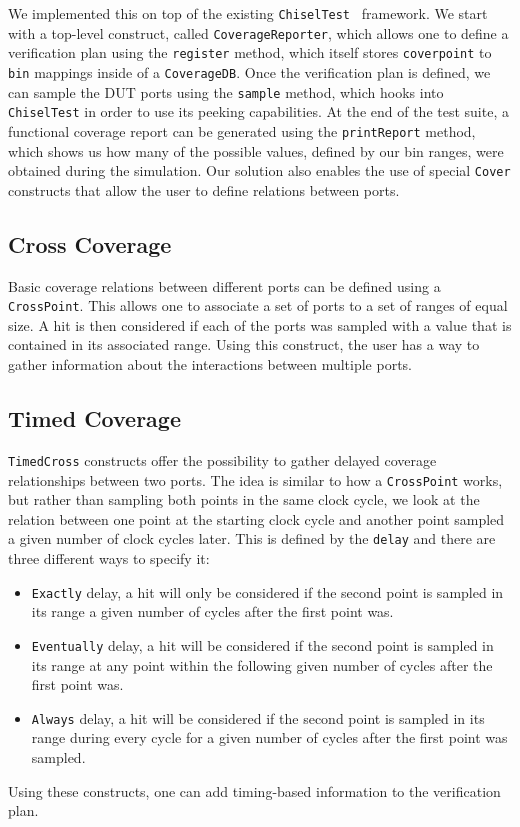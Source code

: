 \documentclass[conference]{IEEEtran}
\begin{document}
We implemented this on top of the existing \texttt{ChiselTest}~\cite{chisel:tester2} framework. We start with a top-level construct, called \texttt{CoverageReporter}, which allows one to define a verification plan using the \texttt{register} method, which itself stores \texttt{coverpoint} to \texttt{bin} mappings inside of a \texttt{CoverageDB}. Once the verification plan is defined, we can sample the DUT ports using the \texttt{sample} method, which hooks into \texttt{ChiselTest} in order to use its peeking capabilities. At the end of the test suite, a functional coverage report can be generated using the \texttt{printReport} method, which shows us how many of the possible values, defined by our bin ranges, were obtained during the simulation.
Our solution also enables the use of special \texttt{Cover} constructs that allow the user to define relations between ports.

\subsection{Cross Coverage}
Basic coverage relations between different ports can be defined using a \texttt{CrossPoint}. 
This allows one to associate a set of ports to a set of ranges of equal size.  
A hit is then considered if each of the ports was sampled with a value that is contained in its associated range.  
Using this construct, the user has a way to gather information about the interactions between multiple ports.  
  
\subsection{Timed Coverage}
\texttt{TimedCross} constructs offer the possibility to gather delayed coverage relationships between two ports. The idea is similar to how a \texttt{CrossPoint} works, but rather than sampling both points in the same clock cycle, we look at the relation between one point at the starting clock cycle and another point sampled a given number of clock cycles later. This is defined by the \texttt{delay} and there are three different ways to specify it:  
\begin{itemize}
 \item \texttt{Exactly} delay, a hit will only be considered if the second point is sampled in its range a given number of cycles after the first point was.
 \item \texttt{Eventually} delay, a hit will be considered if the second point is sampled in its range at any point within the following given number of cycles after the first point was.  
 \item \texttt{Always} delay, a hit will be considered if the second point is sampled in its range during every cycle for a given number of cycles after the first point was sampled.
\end{itemize}  
Using these constructs, one can add timing-based information to the verification plan.
\end{document}

